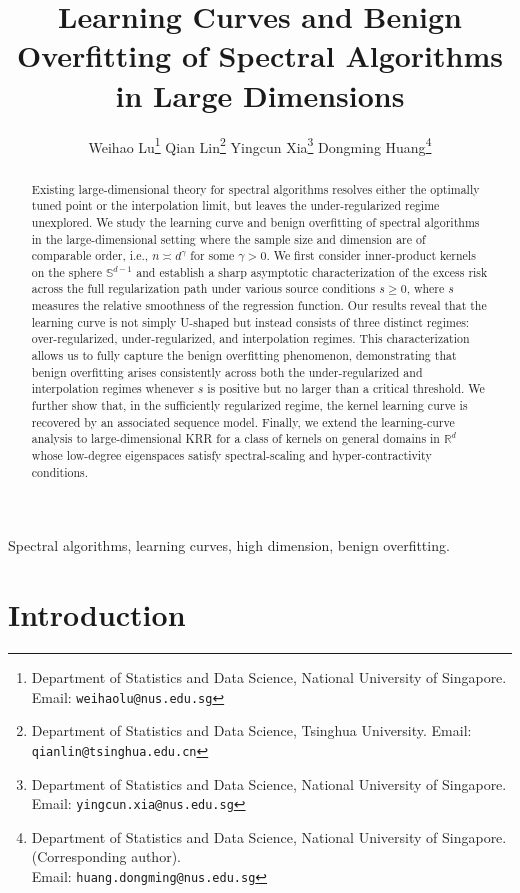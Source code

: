 \documentclass{article}
\title{
    Learning Curves and Benign Overfitting of Spectral Algorithms in Large Dimensions
}
\author{
  Weihao Lu\thanks{Department of Statistics and Data Science, National University of Singapore. Email: \texttt{weihaolu@nus.edu.sg}} 
  \And
  Qian Lin\thanks{Department of Statistics and Data Science, Tsinghua University.  Email: \texttt{qianlin@tsinghua.edu.cn}} 
  \And
  Yingcun Xia\thanks{Department of Statistics and Data Science, National University of Singapore. Email: \texttt{yingcun.xia@nus.edu.sg}}
  \And
  Dongming Huang\thanks{Department of Statistics and Data Science, National University of Singapore. (Corresponding author). \\ Email: \texttt{huang.dongming@nus.edu.sg}} 
}
\theoremstyle{plain}
\theoremstyle{definition}
\theoremstyle{remark}
\begin{document}
\maketitle


\begin{abstract}
    Existing large-dimensional theory for spectral algorithms resolves either the optimally tuned point or the interpolation limit, but leaves the under-regularized regime unexplored. We study the learning curve and benign overfitting of spectral algorithms in the large-dimensional setting where the sample size and dimension are of comparable order, i.e., $n \asymp d^{\gamma}$ for some $\gamma>0$. We first consider inner-product kernels on the sphere $\mathbb{S}^{d-1}$ and establish a sharp asymptotic characterization of the excess risk across the full regularization path under various source conditions $s \geq 0$, where $s$ measures the relative smoothness of the regression function. Our results reveal that the learning curve is not simply U-shaped but instead consists of three distinct regimes: over-regularized, under-regularized, and interpolation regimes. This characterization allows us to fully capture the benign overfitting phenomenon, demonstrating that benign overfitting arises consistently across both the under-regularized and interpolation regimes whenever $s$ is positive but no larger than a critical threshold. We further show that, in the sufficiently regularized regime, the kernel learning curve is recovered by an associated sequence model. Finally, we extend the learning-curve analysis to large-dimensional KRR for a class of kernels on general domains in $\mathbb{R}^d$ whose low-degree eigenspaces satisfy spectral-scaling and hyper-contractivity conditions.
\end{abstract}


Spectral algorithms, learning curves, high dimension, benign overfitting.







\section{Introduction}\label{sec_intro}
\end{document}
